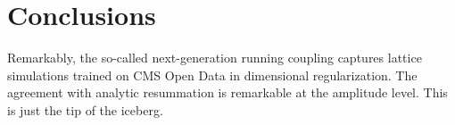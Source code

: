 \section{Conclusions}\label{sec:conclusions}

Remarkably, the so-called next-generation running coupling captures
lattice simulations trained on CMS Open Data in dimensional
regularization. The agreement with analytic resummation is remarkable at
the amplitude level. This is just the tip of the iceberg.

